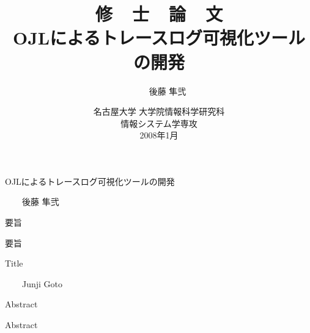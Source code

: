 \documentclass[a4paper,12pt]{jreport}
\title{
{\LARGE\sffamily\gtfamily
修\ \ 士\ \ 論\ \ 文\\
}
\vspace*{.6in}
{\huge\sffamily\gtfamily
OJLによるトレースログ可視化ツールの開発\\
}
\vfill\vfill\vfill
}
\author{
\LARGE\sffamily\gtfamily
350702101\ \ \ \ 後藤 隼弐\\
}
\date{
\vfill
\Large\sffamily\gtfamily
名古屋大学 大学院情報科学研究科\\[.2in]
情報システム学専攻\\[.2in]
2008年1月
\vfill
}
\begin{document}
\pagestyle{empty}
\vspace*{-1in}
\begin{center}
\Large\sffamily\gtfamily OJLによるトレースログ可視化ツールの開発
\end{center}
\begin{flushright}
\large\sffamily{}\ \ \ \ 後藤 隼弐
\end{flushright}
\begin{center}
\large\sffamily\gtfamily 要旨
\end{center}

要旨

\clearpage

\vspace*{-1in}
\begin{center}
\Large\sffamily
Title
\end{center}
\begin{flushright}
\large\sffamily{}\ \ \ \ Junji Goto
\end{flushright}
\begin{center}
\large\sffamily Abstract
\end{center}

Abstract

\clearpage

\maketitle
\clearpage

\pagestyle{plain} 
\setcounter{page}{1}
\tableofcontents
\clearpage

\pagestyle{plain} 
\setcounter{page}{1}
\end{document}
